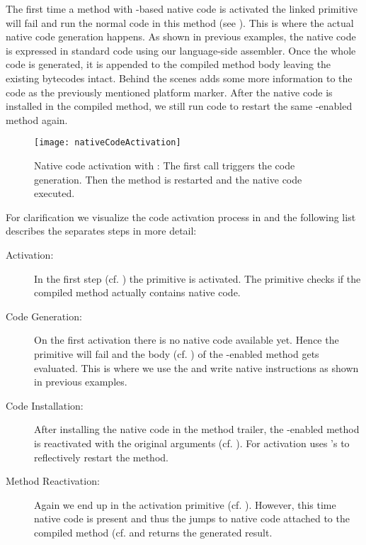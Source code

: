 \noindent The first time a method with \B-based native code is activated the linked \B primitive will fail and run the normal \PH code in this method (see ).
This is where the actual native code generation happens.
As shown in previous examples, the native code is expressed in standard \PH code using our language-side assembler.
Once the whole code is generated, it is appended to the compiled method body leaving the existing \PH bytecodes intact.
Behind the scenes \B adds some more information to the code as the previously mentioned platform marker. 
After the native code is installed in the compiled method, we still run \PH code to restart the same \B-enabled method again.
%
\begin{figure}[ht]
	\centering
	\texttt{[image: nativeCodeActivation]}
	\caption[\B Native Code Acivation]{Native code activation with \B: The first call triggers the code generation. Then the method is restarted and the native code executed.}
\end{figure}
%
For clarification we visualize the code activation process in  and the following list describes the separates steps in more detail:
%
\begin{description}
\item[Activation:] In the first step (cf. ) the \B primitive is activated.
	The primitive checks if the compiled method actually contains native code.
\item[Code Generation:] On the first activation there is no native code available yet.
	Hence the primitive will fail and the \PH body (cf. ) of the \B-enabled method gets evaluated.
	This is where we use the \B \API and write native instructions as shown in previous examples.
\item[Code Installation:] After installing the native code in the method trailer, the \B-enabled method is reactivated with the original arguments (cf. ).
	For activation \B uses \PH's   to reflectively restart the method.
\item[Method Reactivation:] Again we end up in the \B activation primitive (cf. ).
	However, this time native code is present and thus the \B jumps to native code attached to the compiled method (cf.  and returns the generated result.
\end{description}


